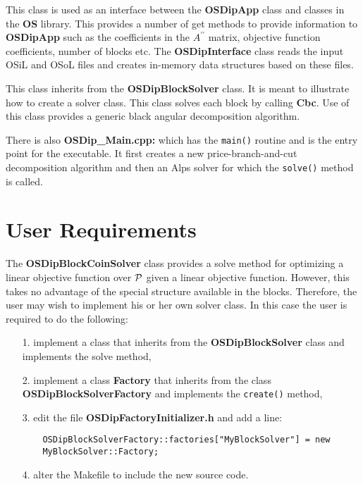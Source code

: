 \documentclass[11pt]{article}
\begin{document}
\vskip 8pt
 This class is used  as an interface between the
{\bf OSDipApp} class and classes in the {\bf OS} library. This provides a number
of get methods to provide information to {\bf OSDipApp} such as the coefficients
in the $A^{\prime \prime}$ matrix, objective function coefficients, number of
blocks etc. The {\bf OSDipInterface} class reads the input OSiL and OSoL files
and creates in-memory data structures based on these files. 


  
\vskip 8pt
  This class inherits from the {\bf
OSDipBlockSolver} class. It is meant to illustrate how to create a solver class.
This class solves each block by calling {\bf Cbc}.  Use of this class provides a
generic black angular decomposition algorithm.



\vskip 8pt
There is also  {\bf OSDip\_Main.cpp:} which has the {\tt main()} routine and is
the entry point for the executable. It first creates a new price-branch-and-cut
decomposition algorithm and then an Alps solver for which the {\tt solve()}
method is called. 


\section{User Requirements}\label{section:userreq}


The {\bf OSDipBlockCoinSolver} class provides a solve method for optimizing a
linear objective function over ${\cal P}$ given a linear objective function.
However, this takes no advantage of the special structure available in the
blocks. Therefore, the user may wish to implement his or her own solver class.
In this case the user is required to do the following:
 
 \begin{itemize}
   
   \item[1.] implement a class that inherits from the {\bf OSDipBlockSolver}
   class and implements the solve method,
   
   \item[2.] implement a class {\bf Factory} that inherits from the class {\bf
OSDipBlockSolverFactory} and implements the {\tt create()} method,

	\item[3.] edit the file {\bf OSDipFactoryInitializer.h} and add a line:
	
	\begin{verbatim}
	OSDipBlockSolverFactory::factories["MyBlockSolver"] = new
	MyBlockSolver::Factory;
	\end{verbatim}
   
   \item[4.] alter the Makefile to include the new source code.
 \end{itemize}
 
\end{document}
